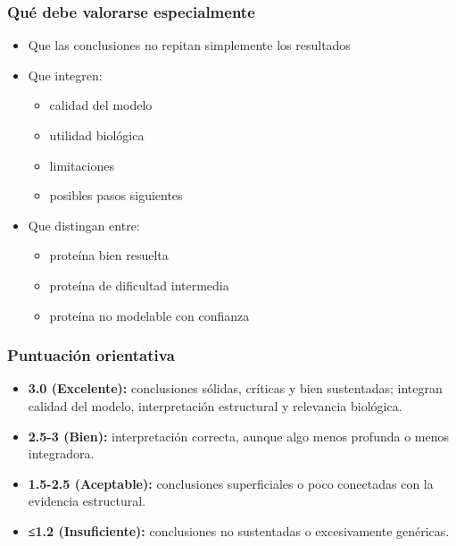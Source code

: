 \documentclass[
  11pt,
  a4paper,
  twoside]{scrreprt}
\providecommand{\tightlist}{%
  \setlength{\itemsep}{0pt}\setlength{\parskip}{0pt}}
\begin{document}
\subsubsection{Qué debe valorarse
especialmente}\label{quuxe9-debe-valorarse-especialmente-2}

\begin{itemize}
\item
  Que las conclusiones no repitan simplemente los resultados
\item
  Que integren:

  \begin{itemize}
  \tightlist
  \item
    calidad del modelo
  \item
    utilidad biológica
  \item
    limitaciones
  \item
    posibles pasos siguientes
  \end{itemize}
\item
  Que distingan entre:

  \begin{itemize}
  \tightlist
  \item
    proteína bien resuelta
  \item
    proteína de dificultad intermedia
  \item
    proteína no modelable con confianza
  \end{itemize}
\end{itemize}

\subsubsection{Puntuación
orientativa}\label{puntuaciuxf3n-orientativa-2}

\begin{itemize}
\item
  \textbf{3.0 (Excelente):} conclusiones sólidas, críticas y bien
  sustentadas; integran calidad del modelo, interpretación estructural y
  relevancia biológica.
\item
  \textbf{2.5-3 (Bien):} interpretación correcta, aunque algo menos
  profunda o menos integradora.
\item
  \textbf{1.5-2.5 (Aceptable):} conclusiones superficiales o poco
  conectadas con la evidencia estructural.
\item
  \textbf{≤1.2 (Insuficiente):} conclusiones no sustentadas o
  excesivamente genéricas.
\end{itemize}
\end{document}

